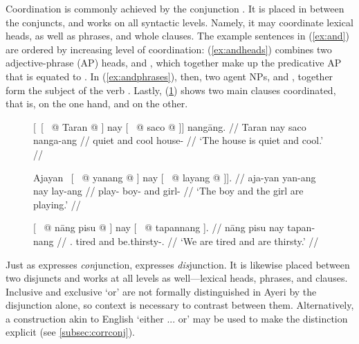 Coordination is commonly achieved by the conjunction . It is
placed in between the conjuncts, and works on all syntactic levels. Namely, it
may coordinate lexical heads, as well as phrases, and whole clauses. The
example sentences in (\ref{ex:and}) are ordered by increasing level of
coordination: (\ref{ex:andheads}) combines two adjective-phrase (AP) heads,
 and , which together make up
the predicative AP that is equated to . In
(\ref{ex:andphrases}), then, two agent NPs,  and
, together form the subject of the verb
. Lastly, (\ref{ex:andclauses}) shows two main
clauses coordinated, that is,  on the
one hand, and  on the other.

\begin{figure}[h]
\pex\label{ex:and}
\a\label{ex:andheads}\begingl
	\gla \textup{[~[~} @ Taran @ \textup{]} nay 
		\textup{[~} @ saco @ \textup{]]} nangāng. //
	\glb {} Taran {} nay {} saco {} nanga-ang //
	\glc {} quiet {} and {} cool {} house-\Aarg{} //
	\glft `The house is quiet and cool.' //
\endgl

\a\label{ex:andphrases}\begingl
	\gla Ajayan \textup{~[~} @ yanang @ \textup{]} nay 
		\textup{[~} @ layang @ \textup{]].} //
	\glb aja-yan {} yan-ang {} nay {} lay-ang {} //
	\glc play-\TplM{} {} boy-\Aarg{} {} and {} girl-\Aarg{} {} //
	\glft `The boy and the girl are playing.' //
\endgl

\a\label{ex:andclauses}\begingl
	\gla \textup{[~} @ nāng pisu @ \textup{]} nay 
		\textup{[~} @ tapannang \textup{].} //
	\glb {} nāng pisu {} nay {} tapan-nang {} //
	\glc {} \Fpl{}.\Aarg{} tired {} and {} be.thirsty-\Fpl{}.\Aarg{} {} //
	\glft `We are tired and are thirsty.' //
\endgl
\xe
\end{figure}

Just as  expresses \emph{con}junction,  
expresses \emph{dis}junction. It is likewise placed between two disjuncts and 
works at all levels as well---lexical heads, phrases, and clauses. Inclusive 
and exclusive `or' are not formally distinguished in Ayeri by the disjunction 
 alone, so context is necessary to contrast between them. 
Alternatively, a construction akin to English `either ... or' may be used to 
make the distinction explicit (see \autoref{subsec:corrconj}).

